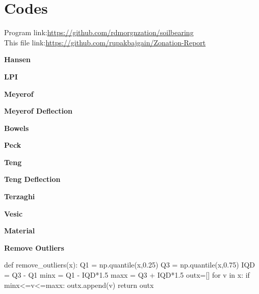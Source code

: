\chapter{Codes}
Program link:\url{https://github.com/rdmorgnzation/soilbearing}\\
This file link:\url{https://github.com/rupakbajgain/Zonation-Report}

\textbf{Hansen}

\textbf{LPI}

\textbf{Meyerof}

\textbf{Meyerof Deflection}

\textbf{Bowels}

\textbf{Peck}

\textbf{Teng}

\textbf{Teng Deflection}

\textbf{Terzaghi}

\textbf{Vesic}

\textbf{Material}

\textbf{Remove Outliers}
\begin{python}
def remove_outliers(x):
    Q1 = np.quantile(x,0.25)
    Q3 = np.quantile(x,0.75)
    IQD = Q3 - Q1
    minx = Q1 - IQD*1.5
    maxx = Q3 + IQD*1.5
    outx=[]
    for v in x:
        if minx<=v<=maxx:
            outx.append(v)
    return outx
\end{python}